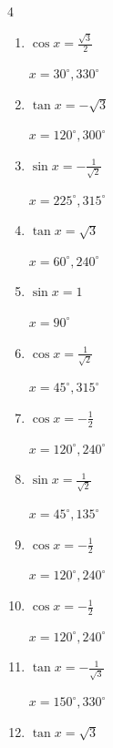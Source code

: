 \begin{multicols}{4}
\begin{enumerate}
        $\displaystyle x = 120^{\circ} , 240^{\circ}$

  \item $\displaystyle \cos{x}  = \frac{\sqrt{3}}{2}$

        $\displaystyle x = 30^{\circ} , 330^{\circ}$

  \item $\displaystyle \tan{x}  = -\sqrt{3}$

        $\displaystyle x = 120^{\circ} , 300^{\circ}$

  \item $\displaystyle \sin{x}  = -\frac{1}{\sqrt{2}}$

        $\displaystyle x = 225^{\circ} , 315^{\circ}$

  \item $\displaystyle \tan{x}  = \sqrt{3}$

        $\displaystyle x = 60^{\circ} , 240^{\circ}$

  \item $\displaystyle \sin{x}  = 1$

        $\displaystyle x = 90^{\circ}$

  \item $\displaystyle \cos{x}  = \frac{1}{\sqrt{2}}$

        $\displaystyle x = 45^{\circ} , 315^{\circ}$

  \item $\displaystyle \cos{x}  = -\frac{1}{2}$

        $\displaystyle x = 120^{\circ} , 240^{\circ}$

  \item $\displaystyle \sin{x}  = \frac{1}{\sqrt{2}}$

        $\displaystyle x = 45^{\circ} , 135^{\circ}$

  \item $\displaystyle \cos{x}  = -\frac{1}{2}$

        $\displaystyle x = 120^{\circ} , 240^{\circ}$

  \item $\displaystyle \cos{x}  = -\frac{1}{2}$

        $\displaystyle x = 120^{\circ} , 240^{\circ}$

  \item $\displaystyle \tan{x}  = -\frac{1}{\sqrt{3}}$

        $\displaystyle x = 150^{\circ} , 330^{\circ}$

  \item $\displaystyle \tan{x}  = \sqrt{3}$


\end{enumerate}
\end{multicols}
